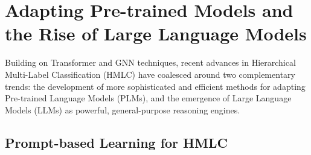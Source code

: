 \section{Adapting Pre-trained Models and the Rise of Large Language Models}

Building on Transformer and GNN techniques, recent advances in Hierarchical Multi-Label Classification (HMLC) have coalesced around two complementary trends: the development of more sophisticated and efficient methods for adapting Pre-trained Language Models (PLMs), and the emergence of Large Language Models (LLMs) as powerful, general-purpose reasoning engines.

\subsection{Prompt-based Learning for HMLC}


